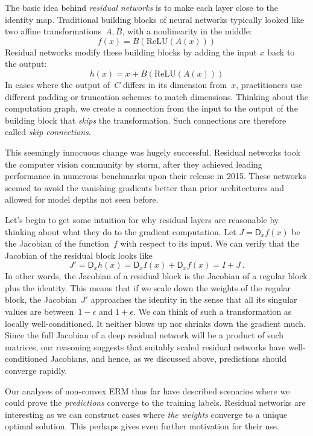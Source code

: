 \documentclass{tufte-book}
\begin{document}
The basic idea behind \emph{residual networks} is to make each layer
close to the identity map. Traditional building blocks of neural
networks typically looked like two affine transformations~\(A, B\), with
a nonlinearity in the middle: \[
f(x)= B(\mathrm{ReLU}(A(x)))
\] Residual networks modify these building blocks by adding the input
\(x\) back to the output: \[
h(x)= x + B(\mathrm{ReLU}(A(x)))
\] In cases where the output of~\(C\) differs in its dimension
from~\(x\), practitioners use different padding or truncation schemes to
match dimensions. Thinking about the computation graph, we create a
connection from the input to the output of the building block that
\emph{skips} the transformation. Such connections are therefore called
\emph{skip connections}.

This seemingly innocuous change was hugely successful. Residual networks
took the computer vision community by storm, after they achieved leading
performance in numerous benchmarks upon their release in 2015. These
networks seemed to avoid the vanishing gradients better than prior
architectures and allowed for model depths not seen before.

Let's begin to get some intuition for why residual layers are reasonable
by thinking about what they do to the gradient computation. Let
\(J = \mathsf{D}_x f(x)\) be the Jacobian of the function~\(f\) with
respect to its input. We can verify that the Jacobian of the residual
block looks like \[
J' = \mathsf{D}_x h(x) = \mathsf{D}_x I(x) + \mathsf{D}_x f(x) = I + J\,.
\] In other words, the Jacobian of a residual block is the Jacobian of a
regular block plus the identity. This means that if we scale down the
weights of the regular block, the Jacobian~\(J'\) approaches the
identity in the sense that all its singular values are
between~\(1-\epsilon\) and \(1+\epsilon\). We can think of such a
transformation as locally well-conditioned. It neither blows up nor
shrinks down the gradient much. Since the full Jacobian of a deep
residual network will be a product of such matrices, our reasoning
suggests that suitably scaled residual networks have well-conditioned
Jacobians, and hence, as we discussed above, predictions should converge
rapidly.

Our analyses of non-convex ERM thus far have described scenarios where
we could prove the \emph{predictions} converge to the training labels.
Residual networks are interesting as we can construct cases where
\emph{the weights} converge to a unique optimal solution. This perhaps
gives even further motivation for their use.
\end{document}
